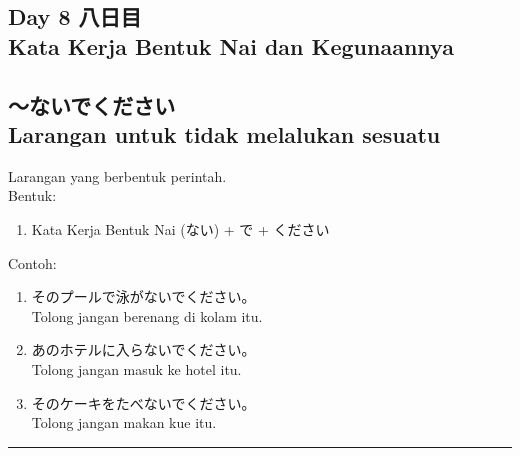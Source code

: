 \begin{flushright}
    \section*{\Large{Day 8 八日目 \\
    Kata Kerja Bentuk Nai dan Kegunaannya}}
\end{flushright}

\subsection*{
    ～ないでください \\ 
    Larangan untuk tidak melalukan sesuatu
}
Larangan yang berbentuk perintah.\\
Bentuk:
\begin{enumerate}
    \item Kata Kerja Bentuk Nai (ない) + で + ください
\end{enumerate}
Contoh: 
\begin{enumerate}
    \item そのプールで泳がないでください。
    \\ Tolong jangan berenang di kolam itu.
    \item あのホテルに入らないでください。
    \\ Tolong jangan masuk ke hotel itu.
    \item そのケーキをたべないでください。
    \\ Tolong jangan makan kue itu.
\end{enumerate}

\vspace{0.2cm}\hrule height 1pt\vspace{0.2cm}


